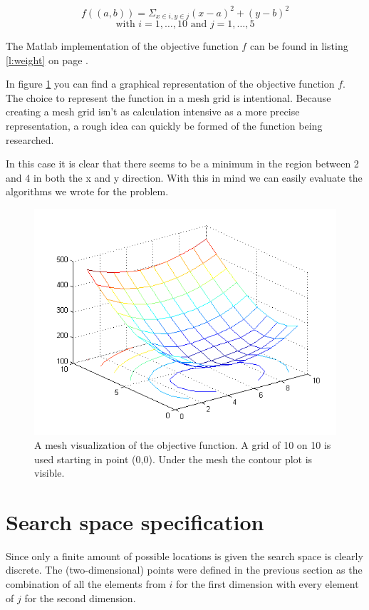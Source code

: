 \documentclass[11pt,a4paper,oneside]{article}
\begin{document}
$$f((a,b)) =  \Sigma_{x \in i, y \in j} (x - a)^2 + (y - b)^2 $$
$$\text{with } i = {1,\ldots,10}\text{ and }j ={1,\ldots,5}$$

The Matlab implementation of the objective function $f$ can be found in listing \ref{l:weight} on page \pageref{l:weight}.

In figure \ref{fig:mesh} you can find a graphical representation of the objective function $f$.
The choice to represent the function in a mesh grid is intentional. 
Because creating a mesh grid isn't as calculation intensive as a more precise representation, a rough idea can quickly be formed of the function being researched.

In this case it is clear that there seems to be a minimum in the region between 2 and 4 in both the x and y direction. With this in mind we can easily evaluate the algorithms we wrote for the problem.

\begin{figure}
		\centering
		\includegraphics{mesh.png}
		\caption{A mesh visualization of the objective function. A grid of 10 on 10 is used starting in point (0,0). Under the mesh the contour plot is visible.}
		\label{fig:mesh}
\end{figure}
\section{Search space specification}
Since only a finite amount of possible locations is given the search space is clearly discrete. The (two-dimensional) points were defined in the previous section as the combination of all the elements from $i$ for the first dimension with every element of $j$ for the second dimension.
\end{document}
